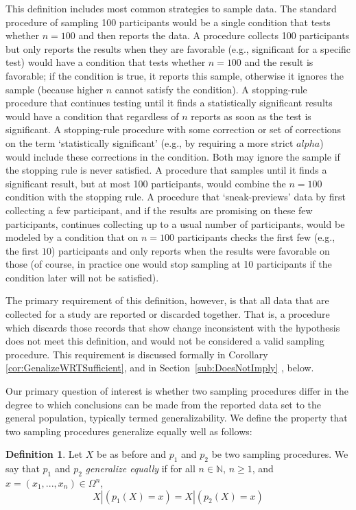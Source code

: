 \documentclass[man]{apa7}
\theoremstyle{definition}
\newtheorem{defn}[thm]{Definition}
\newcommand{\N} {\mathbb{N}}
\begin{document}
This definition includes most common strategies to sample data. The standard procedure of sampling 100 participants would be a single condition that tests whether $n=100$ and then reports the data. A procedure collects 100 participants but only reports the results when they are favorable (e.g., significant for a specific test) would have a condition that tests whether $n=100$ and the result is favorable; if the condition is true, it reports this sample, otherwise it ignores the sample (because higher $n$ cannot satisfy the condition). A stopping-rule procedure that continues testing until it finds a statistically significant results would have a condition that regardless of $n$ reports as soon as the test is significant. A stopping-rule procedure with some correction or set of corrections on the term `statistically significant' (e.g., by requiring a more strict $alpha$) would include these corrections in the condition. Both may ignore the sample if the stopping rule is never satisfied. A procedure that samples until it finds a significant result, but at most 100 participants, would combine the $n=100$ condition with the stopping rule. A procedure that `sneak-previews' data by first collecting a few participant, and if the results are promising on these few participants, continues collecting up to a usual number of participants, would be modeled by a condition that on $n=100$ participants checks the first few (e.g., the first $10$) participants and only reports when the results were favorable on those (of course, in practice one would stop sampling at 10 participants if the condition later will not be satisfied).

The primary requirement of this definition, however, is that all data that are collected for a study are reported or discarded together.  That is, a procedure which discards those records that show change inconsistent with the hypothesis does not meet this definition, and would not be considered a valid sampling procedure.  This requirement is discussed formally in Corollary \ref{cor:GenalizeWRTSufficient}, and in Section~\ref{sub:DoesNotImply}%
, below.

Our primary question of interest is whether two sampling procedures differ in the degree to which conclusions can be made from the reported data set to the general population, typically termed generalizability. We define the property that two sampling procedures generalize equally well as follows:

\begin{defn}
Let $X$ be as before and $p_1$ and $p_2$ be two sampling procedures. We say that $p_1$ and $p_2$ \emph{generalize equally} if for all $n \in \N$, $n\geq1$, and $x = (x_1,...,x_n) \in \Omega^n$,
\begin{equation} X|(p_1(X) = x) = X|(p_2(X) = x) \end{equation}
\end{defn}
\end{document}
